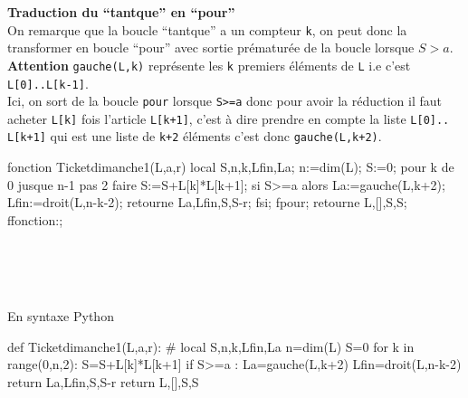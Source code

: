 \documentclass[12pt,a4paper]{book}
\begin{document}
\begin{giacjshere}
{\bf Traduction du ``tantque'' en ``pour''}\\
On remarque que la boucle ``tantque'' a un compteur {\tt k}, on peut donc 
la transformer en boucle ``pour'' avec sortie pr\'ematur\'ee de la boucle
lorsque $S>a$.\\
{\bf Attention}  {\tt gauche(L,k)} repr\'esente les {\tt k} premiers 
\'el\'ements de {\tt L} i.e c'est {\tt L[0]..L[k-1]}.\\
Ici, on sort de la boucle {\tt pour} lorsque {\tt S>=a} donc pour avoir la 
r\'eduction il faut acheter {\tt L[k]} fois l'article {\tt L[k+1]}, c'est \`a 
dire prendre en compte la liste {\tt L[0].. L[k+1]} qui est une liste de
{\tt k+2} \'el\'ements c'est donc {\tt gauche(L,k+2)}.
\begin{giacprog}
fonction Ticketdimanche1(L,a,r) 
 local S,n,k,Lfin,La; 
 n:=dim(L);
 S:=0;
 pour k de 0 jusque n-1 pas 2 faire
   S:=S+L[k]*L[k+1];
   si S>=a alors 
     La:=gauche(L,k+2); 
     Lfin:=droit(L,n-k-2); 
     retourne La,Lfin,S,S-r;
   fsi;
 fpour;
 retourne L,[],S,S;
ffonction:;
\end{giacprog}
\\
\\
\\

En syntaxe Python
\begin{giacprog}
def Ticketdimanche1(L,a,r):
    # local S,n,k,Lfin,La
    n=dim(L)
    S=0
    for k in range(0,n,2):
        S=S+L[k]*L[k+1]
        if S>=a :
            La=gauche(L,k+2)
            Lfin=droit(L,n-k-2)
            return La,Lfin,S,S-r
    return L,[],S,S

\end{giacprog}


\end{giacjshere}
\end{document}
